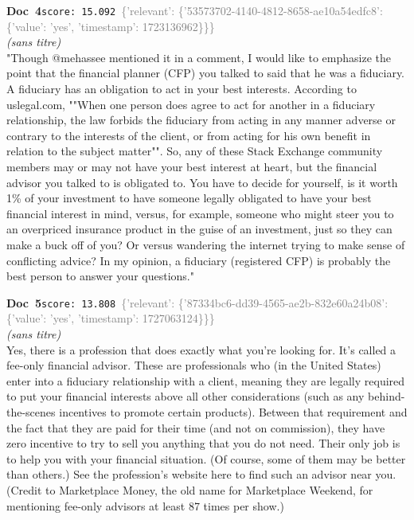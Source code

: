 \documentclass[a4paper,11pt]{article}
\begin{document}
\begin{docenv}
{\footnotesize\textcolor{doccolor}{\textbf{Doc~4}}}\hfill{\tiny\texttt{score:~15.092}}\ {\tiny\textcolor{gray}{\{'relevant': \{'53573702-4140-4812-8658-ae10a54edfc8': \{'value': 'yes', 'timestamp': 1723136962\}\}\}}}\\[3pt]
{\small\textit{(sans titre)}}\\[2pt]
\vspace{2pt}
{\footnotesize 
"Though @mehassee mentioned it in a comment, I would like to emphasize the point that the financial planner (CFP) you talked to said that he was a fiduciary.  A fiduciary has an obligation to act in your best interests.  According to uslegal.com, ""When one person does agree to act for another in a fiduciary relationship, the law forbids the fiduciary from acting in any manner adverse or contrary to the interests of the client, or from acting for his own benefit in relation to the subject matter"".  So, any of these Stack Exchange community members may or may not have your best interest at heart, but the financial advisor you talked to is obligated to. You have to decide for yourself, is it worth 1\% of your investment to have someone legally obligated to have your best financial interest in mind, versus, for example, someone who might steer you to an overpriced insurance product in the guise of an investment, just so they can make a buck off of you?  Or versus wandering the internet trying to make sense of conflicting advice?  In my opinion, a fiduciary (registered CFP) is probably the best person to answer your questions."}
\end{docenv}
\begin{docenv}
{\footnotesize\textcolor{doccolor}{\textbf{Doc~5}}}\hfill{\tiny\texttt{score:~13.808}}\ {\tiny\textcolor{gray}{\{'relevant': \{'87334bc6-dd39-4565-ae2b-832e60a24b08': \{'value': 'yes', 'timestamp': 1727063124\}\}\}}}\\[3pt]
{\small\textit{(sans titre)}}\\[2pt]
\vspace{2pt}
{\footnotesize 
Yes, there is a profession that does exactly what you're looking for.  It's called a fee-only financial advisor. These are professionals who (in the United States) enter into a fiduciary relationship with a client, meaning they are legally required to put your financial interests above all other considerations (such as any behind-the-scenes incentives to promote certain products).  Between that requirement and the fact that they are paid for their time (and not on commission), they have zero incentive to try to sell you anything that you do not need.  Their only job is to help you with your financial situation.  (Of course, some of them may be better than others.) See the profession's website here to find such an advisor near you. (Credit to Marketplace Money, the old name for Marketplace Weekend, for mentioning fee-only advisors at least 87 times per show.)}
\end{docenv}
\end{document}
